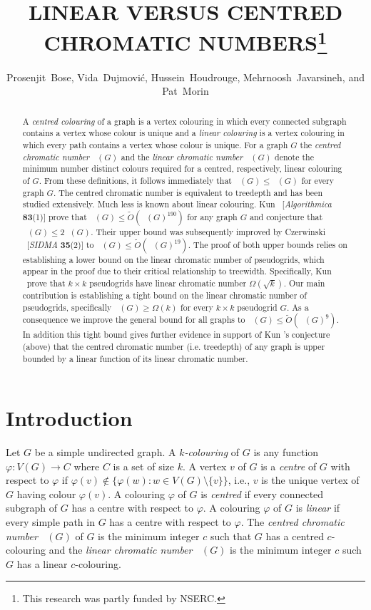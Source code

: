 \documentclass{patmorin}
\title{\MakeUppercase{Linear versus centred chromatic numbers}\thanks{This research was partly funded by NSERC.}}
\author{Prosenjit~Bose, Vida~Dujmović, Hussein~Houdrouge, Mehrnoosh~Javarsineh, and Pat~Morin}
\date{}
\newcommand{\defin}[1]{\emph{\color{brightmaroon}#1}}
\DeclareMathOperator{\chicen}{\chi_{\mathrm{cen}}}
\DeclareMathOperator{\chilin}{\chi_{\mathrm{lin}}}
\begin{document}
\maketitle
\renewcommand{\E}{\mathbb{E}}
\renewcommand{\Pr}{\mathbb{P}}

\begin{abstract}
  A \emph{centred colouring} of a graph is a vertex colouring in which every connected subgraph contains a vertex whose colour is unique and a \emph{linear colouring} is a vertex colouring in which every path contains a vertex whose colour is unique.  For a graph $G$ the \emph{centred chromatic number} $\chicen(G)$ and the \emph{linear chromatic number} $\chilin(G)$ denote the minimum number distinct colours required for a centred, respectively, linear colouring of $G$. From these definitions, it follows immediately that $\chilin(G)\le \chicen(G)$ for every graph $G$. The centred chromatic number is equivalent to treedepth and has been studied extensively. Much less is known about linear colouring.  Kun \etal\ [\textit{Algorithmica} \textbf{83}(1)] prove that $\chicen(G) \le \tilde{O}(\chilin(G)^{190})$ for any graph $G$ and conjecture that $\chicen(G)\le 2\chilin(G)$.  Their upper bound was subsequently improved by Czerwinski \etal\ [\textit{SIDMA} \textbf{35}(2)] to $\chicen(G)\le\tilde{O}(\chilin(G)^{19})$. The proof of both upper bounds relies on establishing a lower bound on the linear chromatic number of pseudogrids, which appear in the proof due to their critical relationship to treewidth.  Specifically, Kun \etal\ prove that $k\times k$ pseudogrids have linear chromatic number $\Omega(\sqrt{k})$. Our main contribution is establishing a tight bound on the linear chromatic number of pseudogrids, specifically $\chilin(G)\ge \Omega(k)$ for every $k\times k$ pseudogrid $G$. As a consequence we improve the general bound for all graphs to $\chicen(G)\le \tilde{O}(\chilin(G)^{9})$. In addition this tight bound gives further evidence in support of Kun \etal's conjecture (above) that the centred chromatic number (i.e. treedepth) of any graph is upper bounded by a linear function of its linear chromatic number.
\end{abstract}

\section{Introduction}

Let $G$ be a simple undirected graph.  A \defin{$k$-colouring} of $G$ is any function $\varphi:V(G)\to C$ where $C$ is a set of size $k$.  A vertex $v$ of $G$ is a \defin{centre} of $G$ with respect to $\varphi$ if $\varphi(v)\not\in\{\varphi(w):w\in V(G)\setminus\{v\}\}$, i.e., $v$ is the unique vertex of $G$ having colour $\varphi(v)$.  A colouring $\varphi$ of $G$ is \defin{centred} if every connected subgraph of $G$ has a centre with respect to $\varphi$. A colouring $\varphi$ of $G$ is \defin{linear} if every simple path in $G$ has a centre with respect to $\varphi$. The \defin{centred chromatic number} $\chicen(G)$ of $G$ is the minimum integer $c$ such that $G$ has a centred $c$-colouring and the \defin{linear chromatic number} $\chilin(G)$ is the minimum integer $c$ such $G$ has a linear $c$-colouring.
\end{document}
